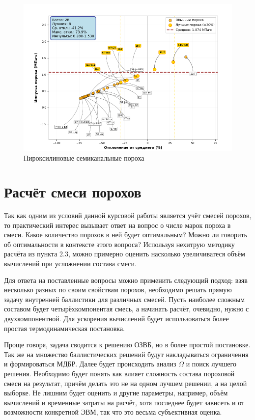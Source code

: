 \documentclass[14pt, a4paper]{extreport} %
\begin{document}
\begin{figure}[H]
\centering
\includegraphics[width=0.6\textheight]{imgs/kaif4.png}
\caption{Пироксилиновые семиканальные пороха}
\end{figure}


\section{Расчёт смеси порохов}

Так как одним из условий данной курсовой работы является учёт смесей порохов, то практический интерес вызывает ответ на вопрос о числе марок пороха в смеси. Какое количество порохов в ней будет оптимальным? Можно ли говорить об оптимальности в контексте этого вопроса?
Используя нехитрую методику расчёта из пункта 2.3, можно примерно оценить насколько увеличиватеся объём вычислений при усложнении состава смеси. 

Для ответа на поставленные вопросы можно применить следующий подход: взяв несколько разных по своим свойствам порохов, необходимо решать прямую задачу внутренней баллистики 
для различных смесей. Пусть наиболее сложным составом будет четырёхкомпонентая смесь, а начинать расчёт, очевидно, нужно с двухкомпонентной. Для ускорения вычислений будет использоваться более простая термодинамическая постановка.

Проще говоря, задача сводится к решению ОЗВБ, но в более простой постановке. Так же на множество баллистических решений будут накладываться ограничения и формироваться МДБР. Далее будет происходить 
анализ $\Omega $ и поиск лучшего решения. Необходимо будет понять как влияет сложность состава пороховой смеси на результат, причём делать это не на одном лучшем решении, а на целой выборке. Не лишним будет 
оценить и другие параметры, например, объём вычислений и временные затраты на расчёт, хотя последнее будет зависеть и от возможности конкретной ЭВМ, так что это весьма субъективная оценка.
\end{document}
